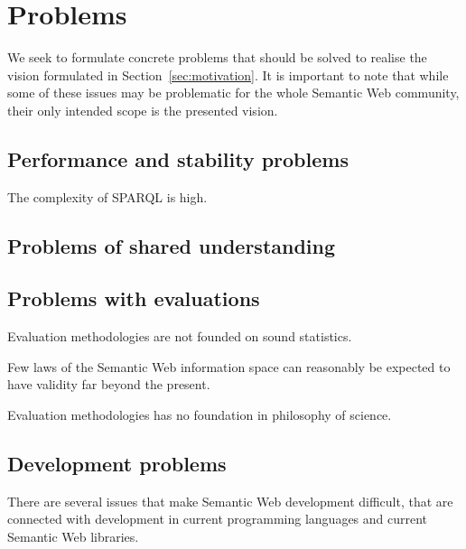 \section{Problems}\label{sec:problems}

We seek to formulate concrete problems that should be solved to
realise the vision formulated in Section~\ref{sec:motivation}. It is
important to note that while some of these issues may be problematic
for the whole Semantic Web community, their only intended scope is the
presented vision.

\subsection{Performance and stability problems}\label{sec:perfproblems}

\begin{problem}
The complexity of SPARQL is high.
\end{problem}

\subsection{Problems of shared understanding}\label{sec:semproblems}

\subsection{Problems with evaluations}\label{sec:evalproblems}

\begin{problem}
Evaluation methodologies are not founded on sound statistics.
\end{problem}

\begin{problem}
Few laws of the Semantic Web information space can reasonably be
expected to have validity far beyond the present.
\end{problem}


\begin{problem}
Evaluation methodologies has no foundation in philosophy of science.
\end{problem}


\subsection{Development problems}\label{sec:devproblems}

There are several issues that make Semantic Web development difficult,
that are connected with development in current programming languages
and current Semantic Web libraries.

